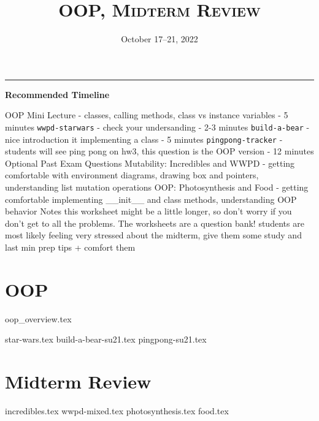 \documentclass{exam}
\title{\textsc{OOP, Midterm Review}}
\date{October 17--21, 2022}
\begin{document}
	\maketitle
	\rule{\textwidth}{0.15em}
	\fontsize{12}{15}\selectfont

\begin{guide}
	\textbf{Recommended Timeline}
	\begin{outline}[enumerate]
		\1 OOP Mini Lecture - classes, calling methods, class vs instance variables - 5 minutes
		\1 \lstinline{wwpd-starwars} - check your undersanding - 2-3 minutes
		\1 \lstinline{build-a-bear} - nice introduction it implementing a class - 5 minutes 
		\1 \lstinline{pingpong-tracker} - students will see ping pong on hw3, this question is the OOP version - 12 minutes
		\1 Optional Past Exam Questions
		\2 Mutability: Incredibles and WWPD - getting comfortable with environment diagrams, drawing box and pointers, understanding list mutation operations
		\2 OOP: Photosynthesis and Food - getting comfortable implementing __init__ and class methods, understanding OOP behavior
		\1 Notes
		\2 this worksheet might be a little longer, so don't worry if you don't get to all the problems. The worksheets are a question bank!
		\2 students are most likely feeling very stressed about the midterm, give them some study and last min prep tips + comfort them
	\end{outline}
\end{guide}


\section{OOP}
{oop_overview.tex}
\newpage
\begin{questions}
{star-wars.tex}
\newpage
{build-a-bear-su21.tex}
{pingpong-su21.tex}
\end{questions}

\section{Midterm Review}
\begin{questions}
{incredibles.tex}
\newpage
{wwpd-mixed.tex}
\newpage
{photosynthesis.tex}
\newpage
{food.tex}
\end{questions}
\end{document}
